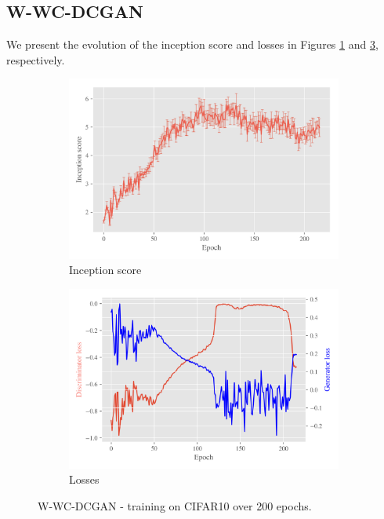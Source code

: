\subsection{W-WC-DCGAN}
\label{sec:exp-w-wc-dcgan}
We present the evolution of the inception score and losses in Figures \ref{fig:exp-w-wc-dcgan-is} and \ref{fig:exp-w-wc-dcgan-losses}, respectively.
   
\begin{figure}[t!]
    \centering
    \begin{subfigure}[t]{0.49\textwidth}
        \centering
		\includegraphics[width=\textwidth]{../code/results/figures/w-wc-dcgan_cifar10_is.png}
		\caption{Inception score}
		\label{fig:exp-w-wc-dcgan-is}
    \end{subfigure}
    \begin{subfigure}[t]{0.49\textwidth}
        \centering
        \includegraphics[width=\textwidth]{../code/results/figures/w-wc-dcgan_cifar10_losses.png}
		\caption{Losses}
		\label{fig:exp-w-wc-dcgan-losses}
    \end{subfigure}
    \caption{W-WC-DCGAN - training on CIFAR10 over 200 epochs.}
\end{figure}